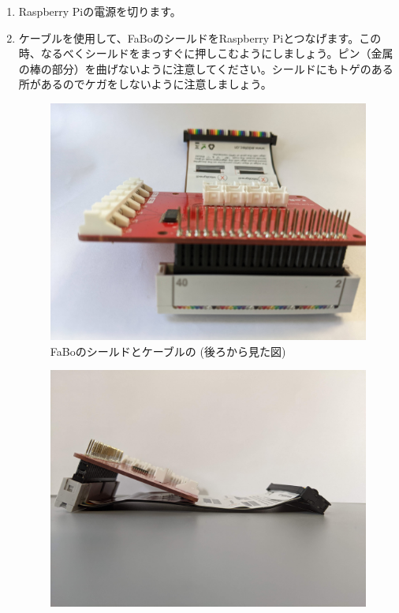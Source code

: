 \begin{enumerate}
\item Raspberry Piの電源を切ります。\\
\item ケーブルを使用して、FaBoのシールドをRaspberry Piとつなげます。この時、なるべくシールドをまっすぐに押しこむようにしましょう。ピン（金属の棒の部分）を曲げないように注意してください。シールドにもトゲのある所があるのでケガをしないように注意しましょう。\\
\begin{figure}[H]
    \centering
    \includegraphics[width=\hsize/2]{images/chap05/fabo_and_cable_rearview.jpg}
    \caption{FaBoのシールドとケーブルの (後ろから見た図)}
\end{figure}
\begin{figure}[H]
    \centering
    \includegraphics[width=\hsize/2]{images/chap05/fabo_and_cable_sideview.png}

\end{figure}
\end{enumerate}
